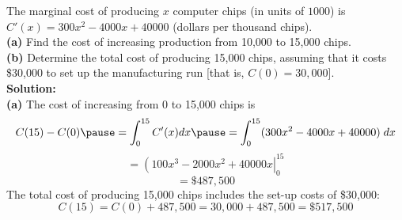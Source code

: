 \begin{frame}
\begin{example}
The marginal cost of producing $x$ computer chips 
(in units of $1000$) is $C'(x) = 300x^2 - 4000x + 40000$ (dollars per thousand chips).\\
{\bf{(a)}} Find the cost of increasing production from 10,000 to 15,000 chips.\\

{\bf{(b)}} Determine the total cost of producing 15,000 chips, assuming that it costs \$30,000 to set up the manufacturing run 
[that is, $C(0) = 30,000$].\\
\textbf{Solution:}\\
\pause 
{\bf{(a)}} The cost of increasing from 0 to 15,000 chips is
\[
C(15)-C(0) \pause =\int_{0}^{15} C'(x) dx \pause =\int_{0}^{15} (300x^2-4000x+40000)\;dx
\]
\[
= \left(100x^3-2000x^2+40000x\right|_{0}^{15}
\]
\[
=\$487,500
\]
The total cost of producing 15,000 chips includes the set-up costs of \$30,000:
\[
C (15) = C (0) + 487,500   =    30,000 + 487,500   =   \$517,500
\]
                 
\end{example}
\end{frame}
